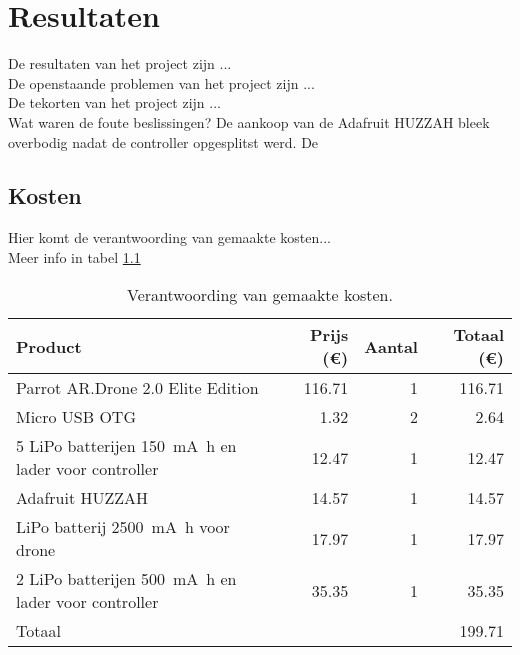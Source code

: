 \chapter{Resultaten}
De resultaten van het project zijn ...\\

De openstaande problemen van het project zijn ...\\

De tekorten van het project zijn ...\\

Wat waren de foute beslissingen?
De aankoop van de Adafruit HUZZAH bleek overbodig nadat de controller opgesplitst werd.
De 

\section{Kosten}
Hier komt de verantwoording van gemaakte kosten...\\

Meer info in tabel \ref{tab:kosten}
\begin{table}[p]
\centering
\begin{tabular}{ |l|r|r|r| } \hline
Product & Prijs (\euro{}) & Aantal & Totaal (\euro{}) \\ [.5ex] \hline \hline
Parrot AR.Drone 2.0 Elite Edition & 116.71 & 1 & 116.71 \\ \hline
Micro USB OTG & 1.32 & 2 & 2.64 \\ \hline
5 LiPo batterijen \SI{150}{\mA\hour} en lader voor controller & 12.47 & 1 & 12.47 \\ \hline
Adafruit HUZZAH & 14.57 & 1 & 14.57 \\ \hline
LiPo batterij \SI{2500}{\mA\hour} voor drone & 17.97 & 1 & 17.97 \\ \hline
2 LiPo batterijen \SI{500}{\mA\hour} en lader voor controller & 35.35 & 1 & 35.35 \\ [.5ex] \hline
\hline
Totaal & & & 199.71 \\ \hline
\end{tabular}
\caption[Kosten]{Verantwoording van gemaakte kosten.}
\label{tab:kosten}
\end{table}
